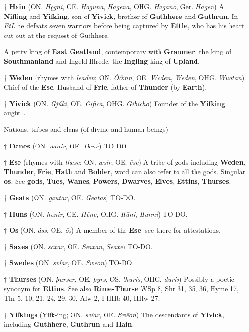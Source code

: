 † \textbf{Hain} (ON. \emph{Hǫgni}, OE. \emph{Haguna}, \emph{Hagena}, OHG. \emph{Hagano}, Ger. \emph{Hagen})
 A \textbf{Nifling} and \textbf{Yifking}, son of \textbf{Yivick}, brother of \textbf{Guthhere} and \textbf{Guthrun}. In \emph{EtL} he defeats seven warriors before being captured by \textbf{Ettle}, who has his heart cut out at the request of Guthhere.
 
 A petty king of \textbf{East Geatland}, contemporary with \textbf{Granmer}, the king of \textbf{Southmanland} and Ingeld Illrede, the \textbf{Ingling} king of \textbf{Upland}.
 
† \textbf{Weden} (rhymes with \emph{leaden}; ON. \emph{Óðinn}, OE. \emph{Wōden}, \emph{Wēden}, OHG. \emph{Wuotan})
 Chief of the \textbf{Ese}. Husband of \textbf{Frie}, father of \textbf{Thunder} (by \textbf{Earth}).

† \textbf{Yivick} (ON. \emph{Gjúki}, OE. \emph{Gifica}, OHG. \emph{Gibicho})
 Founder of the \textbf{Yifking} aught†.

Nations, tribes and clans (of divine and human beings)

† \textbf{Danes} (ON. \emph{danir}, OE. \emph{Dene})
 TO-DO.

† \textbf{Ese} (rhymes with \emph{these}; ON. \emph{æsir}, OE. \emph{ēse})
 A tribe of gods including \textbf{Weden}, \textbf{Thunder}, \textbf{Frie}, \textbf{Hath} and \textbf{Bolder}, word can also refer to all the gods. Singular \textbf{os}. See \textbf{gods}, \textbf{Tues}, \textbf{Wanes}, \textbf{Powers}, \textbf{Dwarves}, \textbf{Elves}, \textbf{Ettins}, \textbf{Thurses}.
 
† \textbf{Geats} (ON. \emph{gautar}, OE. \emph{Gēatas})
 TO-DO.

† \textbf{Huns} (ON. \emph{húnir}, OE. \emph{Hūne}, OHG. \emph{Hūni}, \emph{Hunni})
 TO-DO.
 
† \textbf{Os} (ON. \emph{áss}, OE. \emph{ōs})
 A member of the \textbf{Ese}, see there for attestations.
 
† \textbf{Saxes} (ON. \emph{saxar}, OE. \emph{Seaxan}, \emph{Seaxe})
 TO-DO.

† \textbf{Swedes} (ON. \emph{svíar}, OE. \emph{Swēon})
 TO-DO.

† \textbf{Thurses} (ON. \emph{þursar}, OE. \emph{þyrs}, OS. \emph{thuris}, OHG. \emph{duris})
 Possibly a poetic synonym for \textbf{Ettins}. See also \textbf{Rime-Thurse}
 WSp 8, Shr 31, 35, 36, Hyme 17, Thr 5, 10, 21, 24, 29, 30, Alw 2, I HHb 40, HHw 27.

† \textbf{Yifkings} (Yifk-ing; ON. \emph{svíar}, OE. \emph{Swēon})
 The descendants of \textbf{Yivick}, including \textbf{Guthhere}, \textbf{Guthrun} and \textbf{Hain}.
